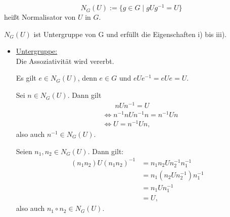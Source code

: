 \documentclass[a4paper]{article}
\begin{document}
    \begin{definition}
        \[
            N_G(U) := \{g \in G  \mid g U g^{-1} = U\} 
        \] 
        heißt Normalisator von $U$ in $G$.
    \end{definition}

    \begin{satz}
        $N_G(U)$ ist Untergruppe von G und erfüllt die Eigenschaften i) bis iii).
    \end{satz}

    \vspace{2mm}

    \begin{beweis}
        \begin{itemize} 
            \item \underline{Untergruppe:} \\
        Die Assoziativität wird vererbt.

        Es gilt $e \in N_G(U)$, denn $e \in G$ und $e U e^{-1} = e U e = U$.

        Sei $n \in N_G(U)$. Dann gilt
        \begin{align*}
            &\phantom{\iff}\ n U n^{-1} = U \\
            &\iff n^{-1} n U n^{-1} n = n ^{-1} U n \\
            &\iff U = n^{-1} U n
        ,\end{align*}
        also auch $n^{-1} \in N_G(U)$.

        Seien $n_1, n_2 \in N_G(U)$. Dann gilt:
        \begin{align*}
            (n_1 n_2) U (n_1 n_2)^{-1} &= n_1 n_2 U n_2^{-1} n_1^{-1} \\
                                       &= n_1 (n_2 U n_2^{-1}) n_1^{-1} \\
                                       &= n_1 U n_1^{-1} \\
                                       &= U
        ,\end{align*}
        also auch $n_1 \circ n_2 \in N_G(U)$. \\


\end{itemize}
\end{beweis}
\end{document}
